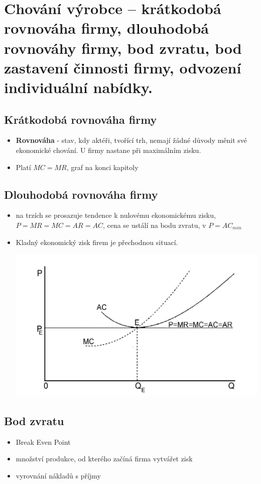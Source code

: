 \clearpage
\section{Chování výrobce – krátkodobá rovnováha firmy, dlouhodobá rovnováhy firmy, bod
zvratu, bod zastavení činnosti firmy, odvození individuální nabídky.}

\subsection{Krátkodobá rovnováha firmy}
\begin{itemize}
    \item \textbf{Rovnováha} - stav, kdy aktéři, tvořící trh, nemají žádné důvody měnit
    své ekonomické chování. U firmy nastane při maximálním zisku.
    \item Platí $MC=MR$, graf na konci kapitoly
\end{itemize}

\subsection{Dlouhodobá rovnováha firmy}
\begin{itemize}
    \item na trzích se prosazuje tendence k nulovému ekonomickému zisku, $P=MR=MC=AR=AC$, cena se ustálí na bodu
    zvratu, v $P=AC_{min}$
    \item Kladný ekonomický zisk firem je přechodnou situací.
    
    \includegraphics[width=15.5cm]{images/9_dlouhodoba.png}
\end{itemize}

\subsection{Bod zvratu}
\begin{itemize}
    \item Break Even Point
    \item množství produkce, od kterého začíná firma vytvářet zisk
    \item vyrovnání nákladů s příjmy
\end{itemize}

